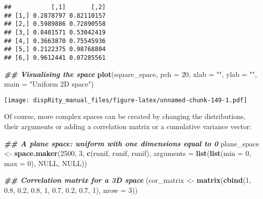 \documentclass[
]{book}
\newenvironment{Shaded}{\begin{snugshade}}{\end{snugshade}}
\newcommand{\AttributeTok}[1]{\textcolor[rgb]{0.13,0.29,0.53}{#1}}
\newcommand{\ConstantTok}[1]{\textcolor[rgb]{0.56,0.35,0.01}{#1}}
\newcommand{\DecValTok}[1]{\textcolor[rgb]{0.00,0.00,0.81}{#1}}
\newcommand{\DocumentationTok}[1]{\textcolor[rgb]{0.56,0.35,0.01}{\textbf{\textit{#1}}}}
\newcommand{\FloatTok}[1]{\textcolor[rgb]{0.00,0.00,0.81}{#1}}
\newcommand{\FunctionTok}[1]{\textcolor[rgb]{0.13,0.29,0.53}{\textbf{#1}}}
\newcommand{\NormalTok}[1]{#1}
\newcommand{\OtherTok}[1]{\textcolor[rgb]{0.56,0.35,0.01}{#1}}
\newcommand{\StringTok}[1]{\textcolor[rgb]{0.31,0.60,0.02}{#1}}
\begin{document}
\begin{verbatim}
##           [,1]       [,2]
## [1,] 0.2878797 0.82110157
## [2,] 0.5989886 0.72890558
## [3,] 0.8401571 0.53042419
## [4,] 0.3663870 0.75545936
## [5,] 0.2122375 0.98768804
## [6,] 0.9612441 0.07285561
\end{verbatim}

\begin{Shaded}
\begin{Highlighting}[]
\DocumentationTok{\#\# Visualising the space}
\FunctionTok{plot}\NormalTok{(square\_space, }\AttributeTok{pch =} \DecValTok{20}\NormalTok{, }\AttributeTok{xlab =} \StringTok{""}\NormalTok{, }\AttributeTok{ylab =} \StringTok{""}\NormalTok{,}
     \AttributeTok{main =} \StringTok{"Uniform 2D space"}\NormalTok{)}
\end{Highlighting}
\end{Shaded}

\texttt{[image: dispRity\_manual\_files/figure-latex/unnamed-chunk-149-1.pdf]}

Of course, more complex spaces can be created by changing the distributions, their arguments or adding a correlation matrix or a cumulative variance vector:

\begin{Shaded}
\begin{Highlighting}[]
\DocumentationTok{\#\# A plane space: uniform with one dimensions equal to 0}
\NormalTok{plane\_space }\OtherTok{\textless{}{-}} \FunctionTok{space.maker}\NormalTok{(}\DecValTok{2500}\NormalTok{, }\DecValTok{3}\NormalTok{, }\FunctionTok{c}\NormalTok{(runif, runif, runif),}
                           \AttributeTok{arguments =} \FunctionTok{list}\NormalTok{(}\FunctionTok{list}\NormalTok{(}\AttributeTok{min =} \DecValTok{0}\NormalTok{, }\AttributeTok{max =} \DecValTok{0}\NormalTok{),}
                           \ConstantTok{NULL}\NormalTok{, }\ConstantTok{NULL}\NormalTok{))}

\DocumentationTok{\#\# Correlation matrix for a 3D space}
\NormalTok{(cor\_matrix }\OtherTok{\textless{}{-}} \FunctionTok{matrix}\NormalTok{(}\FunctionTok{cbind}\NormalTok{(}\DecValTok{1}\NormalTok{, }\FloatTok{0.8}\NormalTok{, }\FloatTok{0.2}\NormalTok{, }\FloatTok{0.8}\NormalTok{, }\DecValTok{1}\NormalTok{, }\FloatTok{0.7}\NormalTok{, }\FloatTok{0.2}\NormalTok{, }\FloatTok{0.7}\NormalTok{, }\DecValTok{1}\NormalTok{), }\AttributeTok{nrow =} \DecValTok{3}\NormalTok{))}
\end{Highlighting}
\end{Shaded}
\end{document}
